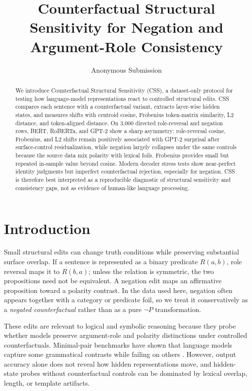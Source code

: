 \documentclass{article}
\title{Counterfactual Structural Sensitivity for Negation and Argument-Role Consistency}
\author{Anonymous Submission}
\begin{document}
\maketitle

\begin{abstract}
We introduce Counterfactual Structural Sensitivity (CSS), a dataset-only protocol for testing how language-model representations react to controlled structural edits. CSS compares each sentence with a counterfactual variant, extracts layer-wise hidden states, and measures shifts with centroid cosine, Frobenius token-matrix similarity, L2 distance, and token-aligned distance. On 3,000 directed role-reversal and negation rows, BERT, RoBERTa, and GPT-2 show a sharp asymmetry: role-reversal cosine, Frobenius, and L2 shifts remain positively associated with GPT-2 surprisal after surface-control residualization, while negation largely collapses under the same controls because the source data mix polarity with lexical foils. Frobenius provides small but repeated in-sample value beyond cosine. Modern decoder stress tests show near-perfect identity judgments but imperfect counterfactual rejection, especially for negation. CSS is therefore best interpreted as a reproducible diagnostic of structural sensitivity and consistency gaps, not as evidence of human-like language processing.
\end{abstract}

\section{Introduction}

Small structural edits can change truth conditions while preserving substantial surface overlap. If a sentence is represented as a binary predicate $R(a,b)$, role reversal maps it to $R(b,a)$; unless the relation is symmetric, the two propositions need not be equivalent. A negation edit maps an affirmative proposition toward a polarity contrast. In the data used here, negation often appears together with a category or predicate foil, so we treat it conservatively as a \emph{negated counterfactual} rather than as a pure $\neg P$ transformation.

These edits are relevant to logical and symbolic reasoning because they probe whether models preserve argument-role and polarity distinctions under controlled counterfactuals. Minimal-pair benchmarks have shown that language models capture some grammatical contrasts while failing on others \cite{warstadt2020blimp,ettinger2020bert,shivagunde2023larger}. However, output accuracy alone does not reveal how hidden representations move, and hidden-state probes without counterfactual controls can be dominated by lexical overlap, length, or template artifacts.
\end{document}
